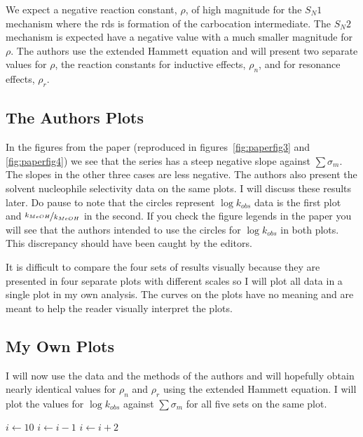 We expect a negative reaction constant, $\rho$, of high magnitude for the $S_N1$ mechanism where the rds is formation of the carbocation intermediate. The $S_N2$ mechanism is expected have a negative value with a much smaller magnitude for $\rho$. The authors use the extended Hammett equation and will present two separate values for $\rho$, the reaction constants for inductive effects, $\rho_n$, and for resonance effects, $\rho_r$.

\subsection{The Authors Plots}
In the figures from the paper (reproduced in figures~\ref{fig:paperfig3} and \vref{fig:paperfig4}) we see that the  series has a steep negative slope against $\sum \sigma_m$. The slopes in the other three cases are less negative. The authors also present the solvent nucleophile selectivity data on the same plots. I will discuss these results later. Do pause to note that the circles represent $\log{k_{obs}}$ data is the first plot and $\nicefrac{k_{MeOH}}{k_{MeOH}}$ in the second. If you check the figure legends in the paper\tss{\ref{ref:1} } you will see that the authors intended to use the circles for $\log{k_{obs}}$ in both plots. This discrepancy should have been caught by the editors. 

It is difficult to compare the four sets of results visually because they are presented in four separate plots with different scales so I will plot all data in a single plot in my own analysis. The curves on the plots have no meaning and are meant to help the reader visually interpret the plots. 

\subsection{My Own Plots}
I will now use the data and the methods of the authors and will hopefully obtain nearly identical values for $\rho_n$ and $\rho_r$ using the extended Hammett equation. I will plot the values for $\log{k_{obs}}$ against $\sum \sigma_m$ for all five sets on the same plot.








\begin{algorithmic}
\State $i \gets 10$
    \State $i \gets i-1$
\Else
        \State $i \gets i+2$
    \EndIf
\EndIf 
\end{algorithmic}
